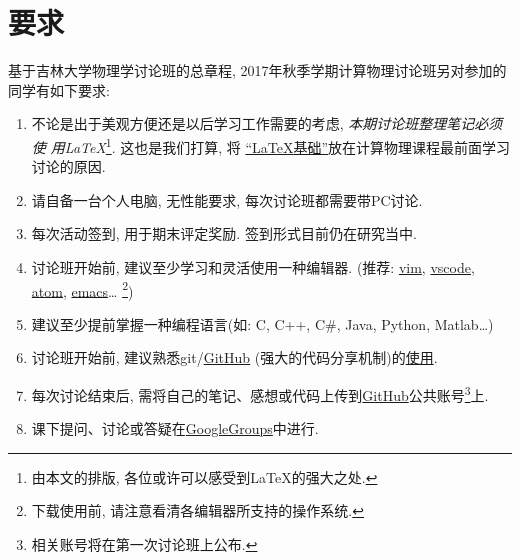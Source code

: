\documentclass[10pt, a4paper, twocolumn]{article}
\begin{document}
  \section{要求}
  基于吉林大学物理学讨论班的总章程, 2017年秋季学期计算物理讨论班另对参加的同学有如下要求:
  \begin{enumerate}
    \item 不论是出于美观方便还是以后学习工作需要的考虑, \emph{本期讨论班整理笔记必须使
          用{\LaTeX}}\footnote{由本文的排版, 各位或许可以感受到{\LaTeX}的强大之处.}.
          这也是我们打算, 将
          \href{https://github.com/louisstuart96/lshort-new-zh-cn/blob/%
                master/lshort-zh-cn.pdf}
          {``{\LaTeX}基础''}放在计算物理课程最前面学习讨论的原因.
    \item 请自备一台个人电脑, 无性能要求, 每次讨论班都需要带PC讨论.
    \item 每次活动签到, 用于期末评定奖励. 签到形式目前仍在研究当中.
    \item 讨论班开始前, 建议至少学习和灵活使用一种编辑器.
    (推荐: \href{http://www.vim.org/}{vim},
          \href{https://code.visualstudio.com}{vscode},
          \href{https://atom.io}{atom},
          \href{http://www.gnu.org/software/emacs/}{emacs}\ldots
          \footnote{下载使用前, 请注意看清各编辑器所支持的操作系统.})
    \item 建议至少提前掌握一种编程语言(如: C, C++, C\#, Java, Python, Matlab\ldots)
    \item 讨论班开始前, 建议熟悉git/\href{https://github.com}{GitHub}
          (强大的代码分享机制)的\href{https://git-scm.com/book/zh/v2}{使用}.
    \item 每次讨论结束后, 需将自己的笔记、感想或代码上传到\href{https://github.com}
          {GitHub}公共账号\footnote{相关账号将在第一次讨论班上公布.}上.
    \item 课下提问、讨论或答疑在\href{https://github.com/JLUComPhy/JLU_Computat%
                ional_Physics/blob/master/JPAs_Discussion.md}{GoogleGroups}中进行.
  \end{enumerate}
\end{document}
